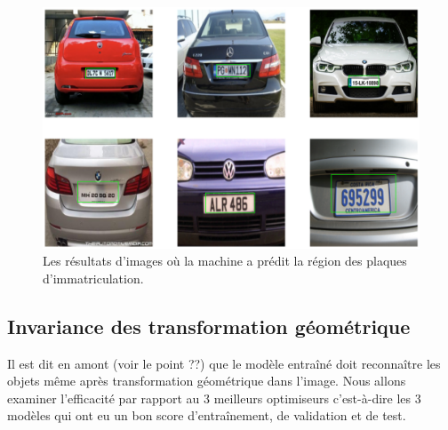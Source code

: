	\begin{figure}[H]%
		\centering
		\includegraphics[width=\textwidth]{images/predicted_image}
		\caption{Les résultats d'images où la machine a prédit la région des plaques d'immatriculation. }
		\label{fig:predicted_image}
	\end{figure}



	
	\subsection{Invariance des transformation géométrique}
	
	
	

	
	
	Il est dit en amont (voir le point ??) que le modèle entraîné doit reconnaître les objets même après transformation géométrique dans l’image. Nous allons examiner l'efficacité par rapport au 3 meilleurs optimiseurs c'est-à-dire les 3 modèles qui ont eu un bon score d'entraînement, de validation et de test.
	
